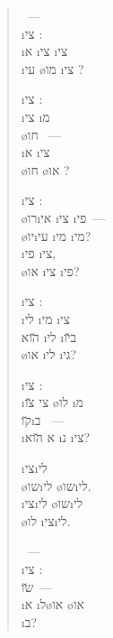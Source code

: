 
\begin{verse}
	~—\\
	\i{צי}  :\\
	\i{א} \i{צי} \i{צי}\\
	\i{עי} \o{מו} \i{צי} ?

	\i{צי}  :\\
	\i{צי} \i{מ} \\
	\o{חו} ~—\\
	\i{א}  \i{צי} \\
	\o{חו} \o{או} ?

	\i{צי}  :\\
	\o{רו}\i{אי} \i{צי}  \i{פי}~—\\
	 \o{יו}\i{עי} \i{מי}   \i{מי}?\\
	\i{פי}  \i{צי},\\
	\o{או} \i{צי}  \i{פי}?

	\i{צי}  :\\
	\i{לי}  \i{מי} \i{צי}\\
	\u{הוא} \i{לי}  \i{ב}\u{יו}\\
	\o{או} \i{לי} \i{גי}?

	\i{צי}  :\\
	\i{צי} \u{צו} \o{לו} \i{מ}\\
	\u{קו}\i{ב} ~—\\
	\i{א} \u{הוא} \i{נ} \i{צי}?

	 \i{צי}\i{לי}\\
	\o{שו}\i{לי} \o{שו}\i{לי}.\\
	\i{צי}\i{לי} \o{שו}\i{לי}\\
	\o{לו}  \i{צי}\i{לי}.

	~—\\
	\i{צי}  :\\
	   \u{שו}~—\\
	\i{א}  \i{ל}\o{או} \o{או}\\
	\i{ב}?
\end{verse}
